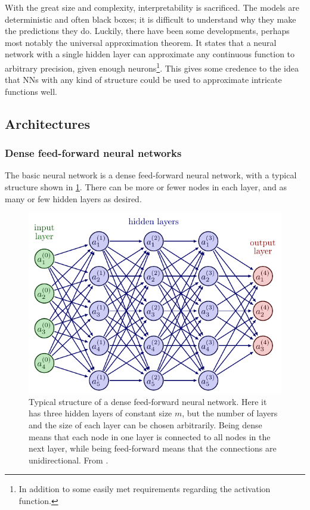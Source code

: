With the great size and complexity, interpretability is sacrificed.
The models are deterministic and often black boxes; it is difficult to understand why they make the predictions they do.
Luckily, there have been some developments, perhaps most notably the universal approximation theorem.
It states that a neural network with a single hidden layer can approximate any continuous function to arbitrary precision, given enough neurons\footnote{In addition to some easily met requirements regarding the activation function.}.
This gives some credence to the idea that NNs with any kind of structure could be used to approximate intricate functions well.

\subsection{Architectures}
\subsubsection{Dense feed-forward neural networks}
The basic neural network is a dense feed-forward neural network, with a typical structure shown in \cref{fig:nn}.
There can be more or fewer nodes in each layer, and as many or few hidden layers as desired.

\begin{figure}
    \centering
    \includegraphics[width=0.85\linewidth, page=4]{neural_networks.pdf}
    \caption[
        Typical structure of a dense feed-forward neural network.
    ]
    {
        Typical structure of a dense feed-forward neural network.
        Here it has three hidden layers of constant size $m$, but the number of layers and the size of each layer can be chosen arbitrarily.
        Being dense means that each node in one layer is connected to all nodes in the next layer, while being feed-forward means that the connections are unidirectional.
        From \cite{nn_figs}.
    }
    \label{fig:nn}
\end{figure}

